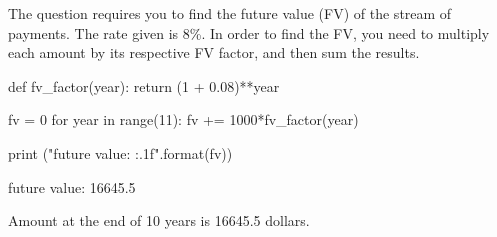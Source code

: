 \cprotEnv\begin{solution}
The question requires you to find the future value (FV) of the stream of payments. The rate given is 8\%.
In order to find the FV, you need to multiply each amount by its respective FV factor, and then sum the results.

\begin{ipython}
def fv_factor(year):
    return (1 + 0.08)**year

fv = 0
for year in range(11):
    fv += 1000*fv_factor(year)

print ("future value: {:.1f}".format(fv))
\end{ipython}
\begin{ioutput}
future value: 16645.5
\end{ioutput}
Amount at the end of 10 years is 16645.5 dollars.
\end{solution}

%
%        
%
%


